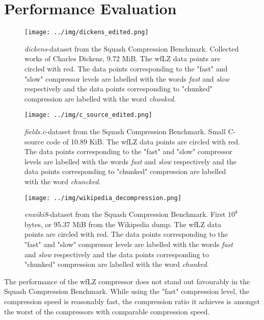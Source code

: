 \documentclass[english]{tktltiki2}
\theoremstyle{definition}
\theoremstyle{remark}
\begin{document}
\section{Performance Evaluation}

\begin{figure}
	\texttt{[image: ../img/dickens\_edited.png]}
	\caption{
		\textit{dickens}-dataset from the Squash Compression Benchmark. Collected works of Charles Dickens, 9.72 MiB. The wfLZ data points are circled with red. The data points corresponding to the "fast" and "slow" compressor levels are labelled with the words \textit{fast} and \textit{slow} respectively and the data points corresponding to "chunked" compression are labelled with the word \textit{chunked}. 
	}
	\label{fig:dickens}
\end{figure}


\begin{figure}
	\texttt{[image: ../img/c\_source\_edited.png]}
	\caption{
		\textit{fields.c}-dataset from the Squash Compression Benchmark. Small C-source code of 10.89 KiB. The wfLZ data points are circled with red. The data points corresponding to the "fast" and "slow" compressor levels are labelled with the words \textit{fast} and \textit{slow} respectively and the data points corresponding to "chunked" compression are labelled with the word \textit{chuncked}. 
	}
	\label{fig:csource}
\end{figure}

\begin{figure}
	\texttt{[image: ../img/wikipedia\_decompression.png]}
	\caption{
		\textit{enwiki8}-dataset from the Squash Compression Benchmark. First $10^8$ bytes, or 95.37 MiB from the Wikipedia dump. The wfLZ data points are circled with red. The data points corresponding to the "fast" and "slow" compressor levels are labelled with the words \textit{fast} and \textit{slow} respectively and the data points corresponding to "chunked" compression are labelled with the word \textit{chunked}.
	}
	\label{fig:wikipedia}
\end{figure}

The performance of the wfLZ compressor does not stand out favourably in the Squash Compression Benchmark. While using the "fast" compression level, the compression speed is reasonably fast, the compression ratio it achieves is amongst the worst of the compressors with comparable compression speed.
\end{document}
